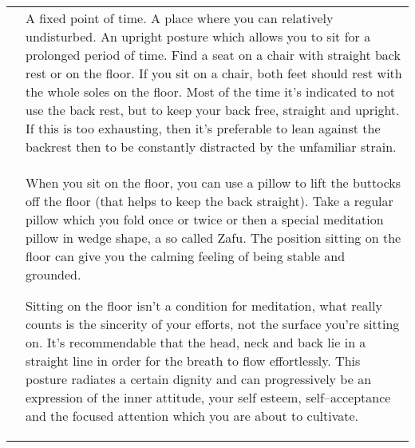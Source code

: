 \documentclass[../main.tex]{subfiles}
\begin{document}
\begin{tabular}{p{1.8cm} p{9.7cm} }
 \raisebox{-1\totalheight}{\texttt{[image: Sitting\_chair\_side]}} & 

 A {fixed point of time}. 
 A place where you can relatively {undisturbed}. 
 An {upright posture} which allows you to sit for a prolonged period of time.\index{meditation!posture} 
 Find a seat on a chair with straight back rest or on the floor.
 If you sit on a chair, both {feet} should rest with the whole {soles on the floor}.
 Most of the time it’s indicated to not use the back rest, but to keep your {back free, straight and upright}.
 If this is too exhausting, then it’s preferable to lean against the backrest then to be constantly distracted by the unfamiliar strain. \\

  \raisebox{-1.2\totalheight}{\texttt{[image: Sitting\_floor\_side]}}&


                                                                                  When you sit on the floor, you can use a {pillow to lift the buttocks} off the floor (that helps to keep the back straight).
                                                                                  Take a {regular pillow} which you {fold} once or twice or then a special meditation pillow in wedge shape, a so called Zafu.
                                                                                  The position sitting on the floor can give you the calming feeling of being {stable and grounded}.



                                                                                  
                                                                                   Sitting on the floor isn't a condition for meditation, what really counts is the {sincerity of your efforts}, not the surface you're sitting on.
                                                                                                   It's recommendable that the {head, neck and back lie in a straight line} in order for the breath to flow effortlessly.
                                                                                                   This posture radiates a certain dignity and can progressively be an {expression of the inner attitude,
                                                                                                   your self esteem, self--acceptance and the focused attention} which you are about to cultivate. \end{tabular}
\end{document}
